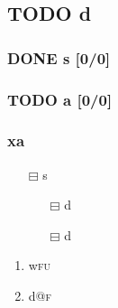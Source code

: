 \documentclass[11pt]{article}
\begin{document}
\subsection{{\bfseries\sffamily TODO} d}
\label{sec:orgb73085a}
\subsubsection{{\bfseries\sffamily DONE} s [0/0]}
\label{sec:orgf764c47}

\subsubsection{{\bfseries\sffamily TODO} a [0/0]}
\label{sec:org8e695c8}

\subsubsection{xa}
\label{sec:org0d821e6}
\begin{itemize}
\item[{$\boxminus$}] s
\begin{itemize}
\item[{$\boxminus$}] d
\item[{$\boxminus$}] d
\end{itemize}
\end{itemize}
\begin{enumerate}
\item w\hfill{}\textsc{fu}
\label{sec:org61e29ba}

\item d\hfill{}\textsc{@f}
\label{sec:orgdf1b278}
\end{enumerate}
\end{document}
